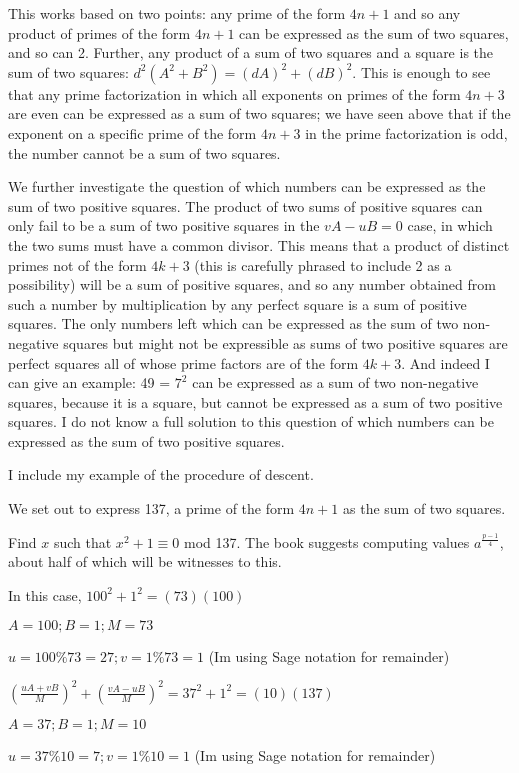 \documentclass[12pt]{article}
\begin{document}
This works based on two points:  any prime of the form $4n+1$ and so any product of primes of the form $4n+1$ can be expressed as the sum of two squares, and so can 2.  Further, any product of a sum of two squares
and a square is the sum of two squares:  $d^2(A^2+B^2) = (dA)^2+(dB)^2$.   This is enough to see that any prime factorization in which all exponents on  primes of the form $4n+3$ are even
can be expressed as a sum of two squares; we have seen above that if the exponent on a specific prime of the form $4n+3$ in the prime factorization is odd, the number cannot be a sum of two squares.

We further investigate the question of which numbers can be expressed as the sum of two positive squares.  The product of two sums of positive squares can only fail to be a sum of two positive squares in the $vA-uB=0$ case, in which the two sums must have a common divisor.   This means that a product of distinct primes not of the form $4k+3$ (this is carefully phrased to include 2 as a possibility)  will be a sum of positive squares, and so any number obtained from such a number by multiplication by any perfect square is a sum of positive squares.  The only numbers left which can be expressed as the sum of two non-negative squares but might not be expressible as sums of two positive squares are perfect squares all of whose prime
factors are of the form $4k+3$.  And indeed I can give an example:  49 = $7^2$ can be expressed as a sum of two non-negative squares, because it is a square, but cannot be expressed as a sum of two positive squares.  I do not know a full solution to this question of which numbers can be expressed as the sum of two positive squares.

I include my example of the procedure of descent.

We set out to express 137, a prime of the form $4n+1$ as the sum of two squares.

Find $x$ such that $x^2+1 \equiv 0$ mod 137.   The book suggests computing values $a^{\frac{p-1}4}$, about half of which will be witnesses to this.

In this case, $100^2+1^2 = (73)(100)$

$A=100; B=1; M=73$

$u=100\%73=27; v=1\%73=1$  (Im using Sage notation for remainder)

$(\frac{uA+vB}M)^2+(\frac{vA-uB}M)^2= 37^2+1^2=(10)(137)$

$A=37; B=1; M=10$

$u=37\%10=7; v=1\%10=1$  (Im using Sage notation for remainder)
\end{document}
